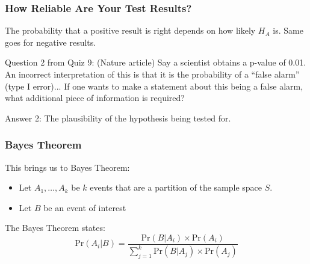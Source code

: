 \documentclass[handout]{beamer}
\newcommand{\blue}[1]{\textcolor{blue2}{#1}}
\newcommand{\prob}{\mbox{Pr}}
\begin{document}
\begin{frame}[fragile]
\frametitle{How Reliable Are Your Test Results?}

The probability that a positive result is right depends on how likely $H_A$ is.  Same goes for negative results.  

\vspace{0.5cm}

\pause\blue{Question 2 from Quiz 9}: (Nature article) Say a scientist obtains a p-value of 0.01.  An incorrect interpretation of this is that it is the probability of a ``false alarm'' (type I error)...  If one wants to make a statement about this being a false alarm, what additional piece of information is required?\\

\vspace{0.5cm}

\pause\blue{Answer 2}: The plausibility of the hypothesis being tested for.  

%

\end{frame}



\begin{frame}[fragile]
\frametitle{Bayes Theorem}

%
%
This brings us to Bayes Theorem: 
\pause\begin{itemize}
\item Let $A_1, \ldots, A_k$ be $k$ events that are a \blue{partition} of the sample space $S$.
\item Let $B$ be an event of interest
\end{itemize}
\pause
\vspace{0.5cm}

The Bayes Theorem states: 
\[
\prob(A_i|B) = \frac{\prob(B|A_i)\times\prob(A_i)}{\sum_{j=1}^{k}\prob(B|A_j)\times\prob(A_j)} 
\]

\end{frame}
\end{document}
